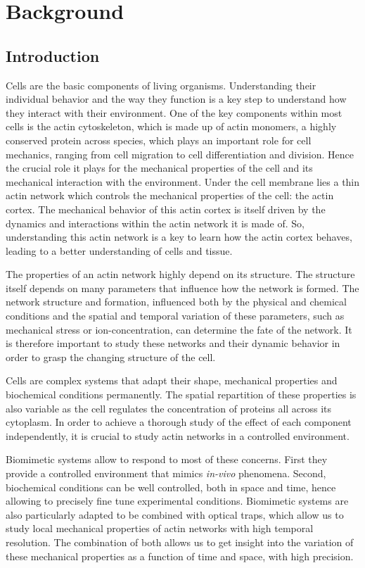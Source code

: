 \documentclass[A4paperpaper,11pt,english]{sphinxmanual}
\begin{document}
\chapter{Background}
\label{index-latex:background}

\section{Introduction}
\label{index-latex:introduction}
Cells are the basic components of living organisms. Understanding their
individual behavior and the way they function is a key step to understand
how they interact with their environment. One of the key components within most
cells is the actin cytoskeleton, which is made up of actin monomers, a highly conserved protein across species, which plays
an important role for cell mechanics, ranging from cell migration to cell differentiation
and division. Hence the crucial role it plays for the mechanical properties of
the cell and its mechanical interaction with the environment. Under the cell membrane lies a
thin actin network which controls the mechanical properties of the cell:
the actin cortex. The mechanical behavior of this actin cortex is itself driven
by the dynamics and interactions within the actin network it is made of.
So, understanding this actin network is a key to learn how the actin
cortex behaves, leading to a better understanding of cells and tissue.

The properties of an actin network highly depend on its structure. The
structure itself depends on many parameters that influence how the network is
formed.  The network structure and formation, influenced both by the physical and
chemical conditions and the spatial and temporal variation of these parameters, such as mechanical
stress or ion-concentration, can determine the fate of the network. It is
therefore important to study these networks and their dynamic behavior in order to grasp the
changing structure of the cell.

Cells are complex systems that adapt their shape, mechanical properties and
biochemical conditions permanently. The spatial repartition of these
properties is also variable as the cell regulates the concentration of proteins
all across its cytoplasm. In order to achieve a thorough study of the effect of each component independently,
it is crucial to study actin networks in a controlled environment.

Biomimetic systems allow to respond to most of these concerns. First they provide a
controlled environment that mimics \emph{in-vivo} phenomena. Second, biochemical conditions
can be well controlled, both in space and time, hence allowing to precisely fine tune
experimental conditions. Biomimetic systems are also particularly adapted to be combined with
optical traps, which allow us to study local mechanical properties of actin
networks with high temporal resolution. The combination of both allows us to get
insight into the variation of these mechanical properties as a function of
time and space, with high precision.
\end{document}
